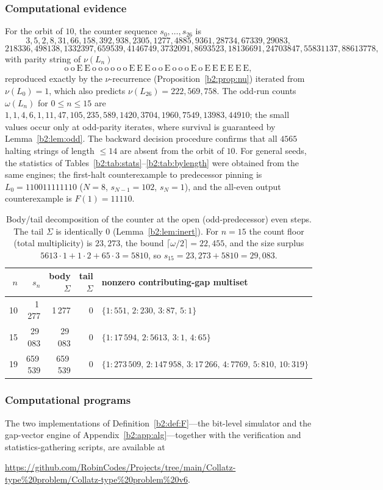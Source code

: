 \documentclass[a4paper]{article}
\theoremstyle{plain}
\theoremstyle{definition}
\theoremstyle{remark}
\begin{document}
\subsubsection{Computational evidence}\label{b2:app:evidence}
For the orbit of $10$, the counter sequence $s_0,\dots,s_{26}$ is
\[ 3,5,2,8,31,66,158,392,938,2305,1277,4885,9361,28734,67339,29083,\]\[218336,498138,1332397,659539,4146749,3732091,8693523,18136691,24703847,55831137,88613778, \]
with parity string of $\nu(L_n)$
\[ \mathrm{o\ o\ E\ E\ o\ o\ o\ o\ o\ o\ E\ E\ E\ o\ o\ E\ o\ o\ o\ E\ o\ E\ E\ E\ E\ E\ E}, \]
reproduced exactly by the $\nu$-recurrence (Proposition~\ref{b2:prop:nu}) iterated from $\nu(L_0)=1$, which also predicts $\nu(L_{26})=222{,}569{,}758$. The odd-run counts $\omega(L_n)$ for $0\le n\le 15$ are $1,1,4,6,1,11,47,105,235,589,1420,3704,1960,7549,13983,44910$; the small values occur only at odd-parity iterates, where survival is guaranteed by Lemma~\ref{b2:lem:odd}. The backward decision procedure confirms that all $4565$ halting strings of length $\le 14$ are absent from the orbit of $10$. For general seeds, the statistics of Tables~\ref{b2:tab:stats}--\ref{b2:tab:bylength} were obtained from the same engines; the first-halt counterexample to predecessor pinning is $L_0=110011111110$ ($N=8$, $s_{N-1}=102$, $s_N=1$), and the all-even output counterexample is $F(1)=11110$.

\begin{table}[H]\centering
\begin{tabular}{rrrr|l}
$n$ & $s_n$ & body $\Sigma$ & tail $\Sigma$ & nonzero contributing-gap multiset\\
\hline
10 & 1\,277 & 1\,277 & 0 & $\{1:551,\,2:230,\,3:87,\,5:1\}$\\
15 & 29\,083 & 29\,083 & 0 & $\{1:17\,594,\,2:5613,\,3:1,\,4:65\}$\\
19 & 659\,539 & 659\,539 & 0 & $\{1:273\,509,\,2:147\,958,\,3:17\,266,\,4:7769,\,5:810,\,10:319\}$
\end{tabular}
\caption{Body/tail decomposition of the counter at the open (odd-predecessor) even steps. The tail $\Sigma$ is identically $0$ (Lemma~\ref{b2:lem:inert}). For $n=15$ the count floor (total multiplicity) is $23{,}273$, the bound $\lceil\omega/2\rceil=22{,}455$, and the size surplus $5613\cdot 1+1\cdot 2+65\cdot 3=5810$, so $s_{15}=23{,}273+5810=29{,}083$.}
\label{b2:tab:decomp}
\end{table}

\subsubsection{Computational programs}\label{b2:app:programs}
The two implementations of Definition~\ref{b2:def:F}---the bit-level simulator and the gap-vector engine of Appendix~\ref{b2:app:alg}---together with the verification and statistics-gathering scripts, are available at
\begin{center}
\url{https://github.com/RobinCodes/Projects/tree/main/Collatz-type%20problem/Collatz-type%20problem%20v6}.
\end{center}
\end{document}
